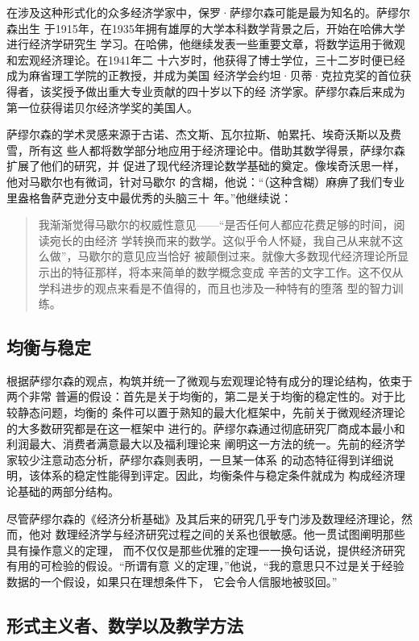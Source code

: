 在涉及这种形式化的众多经济学家中，保罗·萨缪尔森可能是最为知名的。萨缪尔森出生
于1915年，在1935年拥有雄厚的大学本科数学背景之后，开始在哈佛大学进行经济学研究生
学习。在哈佛，他继续发表一些重要文章，将数学运用于微观和宏观经济理论。在1941年二
十六岁时，他获得了博士学位，三十二岁时便已经成为麻省理工学院的正教授，并成为美国
经济学会约坦·贝蒂·克拉克奖的首位获得者，该奖授予做出重大专业贡献的四十岁以下的经
济学家。萨缪尔森后来成为第一位获得诺贝尔经济学奖的美国人。

萨缪尔森的学术灵感来源于古诺、杰文斯、瓦尔拉斯、帕累托、埃奇沃斯以及费雪，所有这
些人都将数学部分地应用于经济理论中。借助其数学得景，萨绿尔森扩展了他们的研究，并
促进了现代经济理论数学基础的奠定。像埃奇沃思一样，他对马歇尔也有微词，针对马歇尔
的含糊，他说：“（这种含糊）麻痹了我们专业里盎格鲁萨克逊分支中最优秀的头脑三十
年。”他继续说：
\begin{quotation}
  我渐渐觉得马歇尔的权威性意见——“是否任何人都应花费足够的时间，阅读宛长的由经济
  学转换而来的数学。这似乎令人怀疑，我自己从来就不这么做”，马歇尔的意见应当恰好
  被颠倒过来。就像大多数现代经济理论所显示出的特征那样，将本来简单的数学概念变成
  辛苦的文字工作。这不仅从学科进步的观点来看是不值得的，而且也涉及一种特有的堕落
  型的智力训练。
\end{quotation}

\subsection{均衡与稳定}

根据萨缪尔森的观点，构筑并统一了微观与宏观理论特有成分的理论结构，依束于两个非常
普遍的假设：首先是关于均衡的，第二是关于均衡的稳定性的。对于比较静态问题，均衡的
条件可以置于熟知的最大化框架中，先前关于微观经济理论的大多数研究都是在这一框架中
进行的。萨缪尔森通过彻底研究厂商成本最小和利润最大、消费者满意最大以及福利理论来
阐明这一方法的统一。先前的经济学家较少注意动态分析，萨缪尔森则表明，一旦某一体系
的动态特征得到详细说明，该体系的稳定性能得到评定。因此，均衡条件与稳定条件就成为
构成经济理论基础的两部分结构。

尽管萨缪尔森的《经济分析基础》及其后来的研究几乎专门涉及数理经济理论，然而，他对
数理经济学与经济研究过程之间的关系也很敏感。他一贯试图阐明那些具有操作意义的定理，
而不仅仅是那些优雅的定理一一换句话说，提供经济研究有用的可检验的假设。“所谓有意
义的定理，”他说，“我的意思只不过是关于经验数据的一个假设，如果只在理想条件下，
它会令人信服地被驳回。”

\subsection{形式主义者、数学以及教学方法}

